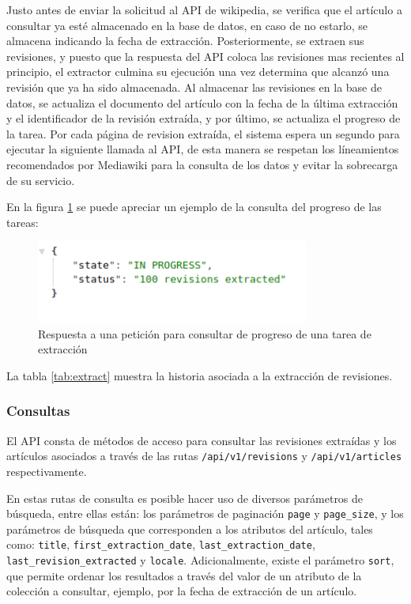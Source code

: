 Justo antes de enviar la solicitud al API de wikipedia, se verifica que el artículo a consultar ya esté almacenado en la base de datos, en caso de no estarlo, se almacena indicando la fecha de extracción.
Posteriormente, se extraen sus revisiones, y puesto que la respuesta del API coloca las revisiones mas recientes al principio, el extractor culmina su ejecución una vez determina que alcanzó una revisión que ya ha sido almacenada.
Al almacenar las revisiones en la base de datos, se actualiza el documento del artículo con la fecha de la última extracción y el identificador de la revisión extraída, y por último, se actualiza el progreso de la tarea.
Por cada página de revision extraída, el sistema espera un segundo para ejecutar la siguiente llamada al API, de esta manera se respetan los líneamientos recomendados por Mediawiki para la consulta de los datos y evitar
la sobrecarga de su servicio. 

En la figura \ref{fig:response_status} se puede apreciar un ejemplo de la consulta del progreso de las tareas:

\begin{figure}[H]
	\centering
		\includegraphics[width=0.8\textwidth]{figures/response_status}
	\caption{Respuesta a una petición para consultar de progreso de una tarea de extracción}
	\label{fig:response_status}
\end{figure}

La tabla \ref{tab:extract} muestra la historia asociada a la extracción de revisiones.



\subsubsection{Consultas}

El API consta de métodos de acceso para consultar las revisiones extraídas y
los artículos asociados a través de las rutas \texttt{/api/v1/revisions} y \texttt{/api/v1/articles} respectivamente.

En estas rutas de consulta es posible hacer uso de diversos parámetros de búsqueda,
entre ellas están: los parámetros de paginación \texttt{page} y \texttt{page\_size},
y los parámetros de búsqueda que corresponden a los atributos del artículo,
tales como: \texttt{title}, \texttt{first\_extraction\_date}, \texttt{last\_extraction\_date}, \texttt{last\_revision\_extracted} y \texttt{locale}.
Adicionalmente, existe el parámetro \texttt{sort}, que permite ordenar los resultados a través del valor de un atributo de la colección a consultar, ejemplo, por la fecha de extracción de un artículo.

